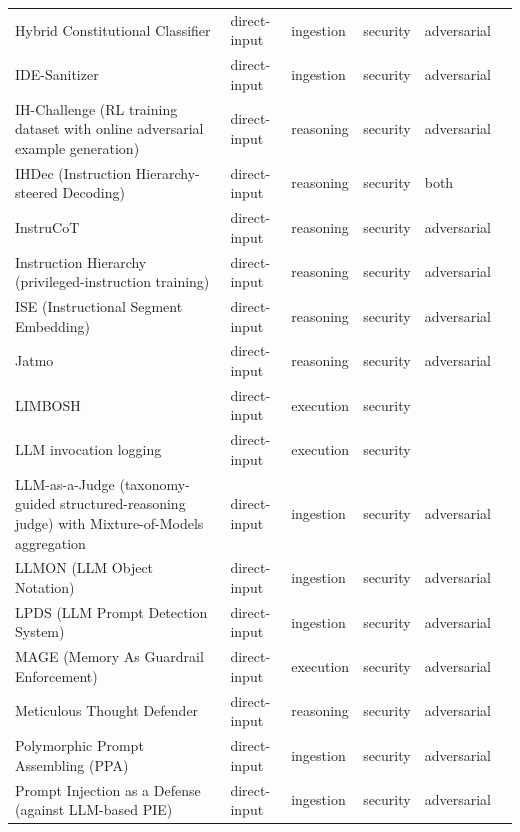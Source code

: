 \begin{longtable}{@{}p{}lllll@{}}
Hybrid Constitutional Classifier & direct-input & ingestion & security & adversarial & \cite{lan-2025-hybrid} \\
IDE-Sanitizer & direct-input & ingestion & security & adversarial & \cite{nkoro-2026-idesanitizer} \\
IH-Challenge (RL training dataset with online adversarial example generation) & direct-input & reasoning & security & adversarial & \cite{guo-2026-ihchallenge} \\
IHDec (Instruction Hierarchy-steered Decoding) & direct-input & reasoning & security & both & \cite{liu-2026-ihdec} \\
InstruCoT & direct-input & reasoning & security & adversarial & \cite{chang-2026-know} \\
Instruction Hierarchy (privileged-instruction training) & direct-input & reasoning & security & adversarial & \cite{wallace-2024-instruction} \\
ISE (Instructional Segment Embedding) & direct-input & reasoning & security & adversarial & \cite{wu-2024-instructional} \\
Jatmo & direct-input & reasoning & security & adversarial & \cite{piet-2023-jatmo} \\
LIMBOSH & direct-input & execution & security &  & \cite{johnson-2024-modular} \\
LLM invocation logging & direct-input & execution & security &  & \cite{chernyshev-2023-large} \\
LLM-as-a-Judge (taxonomy-guided structured-reasoning judge) with Mixture-of-Models aggregation & direct-input & ingestion & security & adversarial & \cite{le-2026-prompt} \\
LLMON (LLM Object Notation) & direct-input & ingestion & security & adversarial & \cite{hind-2026-llmon} \\
LPDS (LLM Prompt Detection System) & direct-input & ingestion & security & adversarial & \cite{kim-2024-protection} \\
MAGE (Memory As Guardrail Enforcement) & direct-input & execution & security & adversarial & \cite{wang-2026-mage} \\
Meticulous Thought Defender & direct-input & reasoning & security & adversarial & \cite{shi-2025-meticulous} \\
Polymorphic Prompt Assembling (PPA) & direct-input & ingestion & security & adversarial & \cite{wang-2025-protect} \\
Prompt Injection as a Defense (against LLM-based PIE) & direct-input & ingestion & security & adversarial & \cite{liu-2024-evaluating} \\

\end{longtable}
